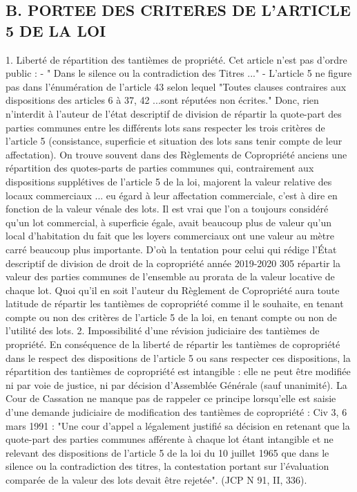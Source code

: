 	\subsection{B. PORTEE DES CRITERES DE L’ARTICLE 5 DE LA LOI}
	
		1. Liberté de répartition des tantièmes de propriété.
		Cet article n'est pas d'ordre public :
		- " Dans le silence ou la contradiction des Titres ..."
		- L'article 5 ne figure pas dans l'énumération de l'article 43 selon lequel "Toutes clauses contraires aux dispositions des articles 6 à 37, 42 ...sont réputées non écrites."
		Donc, rien n'interdit à l'auteur de l'état descriptif de division de répartir la quote-part des parties communes entre les différents lots sans respecter les trois critères de l'article 5 (consistance, superficie et situation des lots sans tenir compte de leur affectation).
		On trouve souvent dans des Règlements de Copropriété anciens une répartition des quotes-parts de parties communes qui, contrairement aux dispositions supplétives de l'article 5 de la loi, majorent la valeur relative des locaux commerciaux ... eu égard à leur affectation commerciale, c'est à dire en fonction de la valeur vénale des lots.
		Il est vrai que l'on a toujours considéré qu'un lot commercial, à superficie égale, avait beaucoup plus de valeur qu'un local d'habitation du fait que les loyers commerciaux ont une valeur au mètre carré beaucoup plus importante. D'où la tentation pour celui qui rédige l’État descriptif de division de
		droit de la copropriété année 2019-2020
		305
		répartir la valeur des parties communes de l'ensemble au prorata de la valeur locative de chaque lot.
		Quoi qu'il en soit l'auteur du Règlement de Copropriété aura toute latitude de répartir les tantièmes de copropriété comme il le souhaite, en tenant compte ou non des critères de l'article 5 de la loi, en tenant compte ou non de l'utilité des lots.
		2. Impossibilité d’une révision judiciaire des tantièmes de propriété.
		En conséquence de la liberté de répartir les tantièmes de copropriété dans le respect des dispositions de l'article 5 ou sans respecter ces dispositions, la répartition des tantièmes de copropriété est intangible : elle ne peut être modifiée ni par voie de justice, ni par décision d’Assemblée Générale (sauf unanimité).
		La Cour de Cassation ne manque pas de rappeler ce principe lorsqu'elle est saisie d'une demande judiciaire de modification des tantièmes de copropriété :
		Civ 3\degres, 6 mars 1991 : "Une cour d'appel a légalement justifié sa décision en retenant que la quote-part des parties communes afférente à chaque lot étant intangible et ne relevant des dispositions de l'article 5 de la loi du 10 juillet 1965 que dans le silence ou la contradiction des titres, la contestation portant sur l'évaluation comparée de la valeur des lots devait être rejetée". (JCP N 91, II, 336).
	
